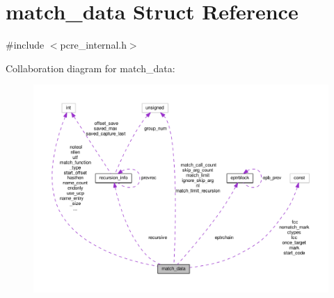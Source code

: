 \hypertarget{structmatch__data}{}\section{match\+\_\+data Struct Reference}
\label{structmatch__data}


{\ttfamily \#include $<$pcre\+\_\+internal.\+h$>$}



Collaboration diagram for match\+\_\+data\+:
\nopagebreak
\begin{figure}[H]
\begin{center}
\leavevmode
\includegraphics[width=350pt]{structmatch__data__coll__graph}
\end{center}
\end{figure}
